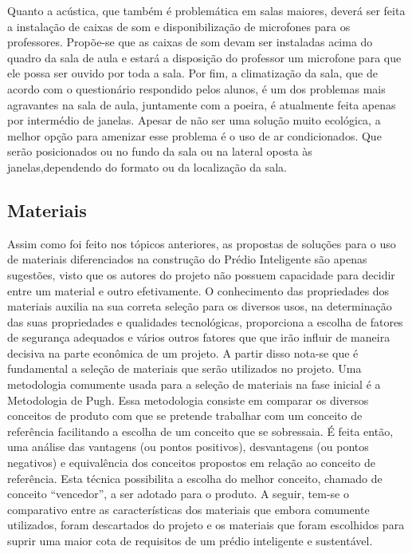 Quanto a acústica, que também é problemática em salas maiores, deverá ser feita a instalação de caixas de som e disponibilização de microfones para os professores. Propõe-se que as caixas de som devam ser instaladas acima do quadro da sala de aula e estará a disposição do professor um microfone para que ele possa ser ouvido por toda a sala.
Por fim, a climatização da sala, que de acordo com o questionário respondido pelos alunos, é um dos problemas mais agravantes na sala de aula, juntamente com a poeira, é atualmente feita apenas por intermédio de janelas. Apesar de não ser uma solução muito ecológica, a melhor opção para amenizar esse problema é o uso de ar condicionados. Que serão posicionados ou no fundo da sala ou na lateral oposta às janelas,dependendo do formato ou da localização da sala.

\subsection{Materiais}

Assim como foi feito nos tópicos anteriores, as propostas de soluções para o uso de materiais diferenciados na construção do Prédio Inteligente são apenas sugestões, visto que os autores do projeto não possuem capacidade para decidir entre um material e outro efetivamente. 
O conhecimento das propriedades dos materiais auxilia na sua correta seleção para os diversos usos, na determinação das suas propriedades e qualidades tecnológicas, proporciona a escolha de fatores de segurança adequados e vários outros fatores que que irão influir de maneira decisiva na parte econômica de um projeto.
A partir disso nota-se que é fundamental a seleção de materiais que serão utilizados no projeto. Uma metodologia comumente usada para a seleção de materiais na fase inicial é a Metodologia de Pugh. Essa metodologia consiste em comparar os diversos conceitos de produto com que se pretende trabalhar com um conceito de referência facilitando a escolha de um conceito que se sobressaia.
É feita então, uma análise das vantagens (ou pontos positivos), desvantagens (ou pontos negativos) e equivalência dos conceitos propostos em relação ao conceito de referência. Esta técnica possibilita a escolha do melhor conceito, chamado de conceito “vencedor”, a ser adotado para o produto.
A seguir, tem-se o comparativo entre as características dos materiais que embora comumente utilizados, foram descartados do projeto e os materiais que foram escolhidos para suprir uma maior cota de requisitos de um prédio inteligente e sustentável.

